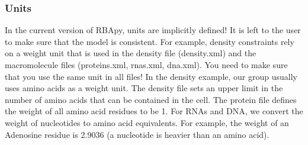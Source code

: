 \documentclass[12pt]{scrartcl}
\begin{document}
\subsubsection{Units}

In the current version of RBApy, units are implicitly defined!
It is left to the user to make sure that the model is consistent.
For example, density constraints rely on a weight unit that is used in the
density file (density.xml) and the macromolecule files (proteins.xml, rnas.xml,
dna.xml).
You need to make sure that you use the same unit in all files!
In the density example, our group usually uses amino acids as a weight unit.
The density file sets an upper limit in the number of amino acids that can be
contained in the cell.
The protein file defines the weight of all amino acid residues to be 1.
For RNAs and DNA, we convert the weight of nucleotides to amino acid equivalents.
For example, the weight of an Adenosine residue is 2.9036
(a nucleotide is heavier than an amino acid).








\end{document}
